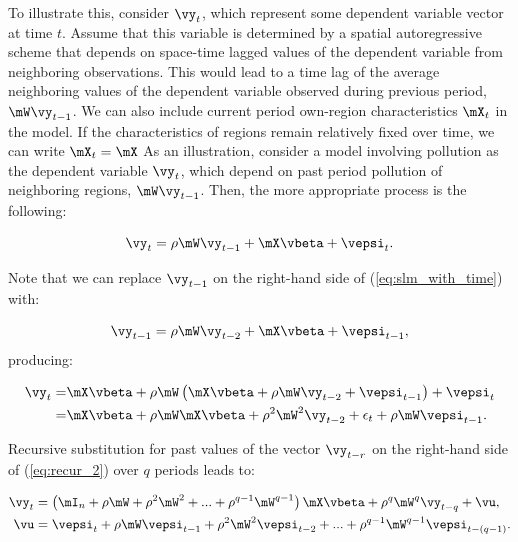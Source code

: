\documentclass[english,12pt]{book}\usepackage[]{graphicx}\usepackage[]{xcolor}
\begin{document}
To illustrate this, consider $\vy_t$, which represent some dependent variable vector at time $t$. Assume that this variable is determined by a spatial autoregressive scheme that depends on space-time lagged values of the dependent variable from neighboring observations. This would lead to a time lag of the average neighboring values of the dependent variable observed during previous period,  $\mW\vy_{t-1}$. We can also include current period own-region characteristics $\mX_t$ in the model. If the characteristics of regions remain relatively fixed over time, we can write $\mX_t = \mX$ As an illustration, consider a model involving pollution as the dependent variable $\vy_t$, which depend on past period pollution of neighboring regions, $\mW\vy_{t-1}$. Then, the more appropriate process is the following:

\begin{equation}\label{eq:slm_with_time}
\vy_t = \rho \mW\vy_{t-1} + \mX\vbeta + \vepsi_t.
\end{equation}

Note that we can replace $\vy_{t-1}$ on the right-hand side of (\ref{eq:slm_with_time}) with:

\begin{equation*}
\vy_{t-1} = \rho \mW\vy_{t-2} + \mX\vbeta + \vepsi_{t-1},
\end{equation*}
%
producing:

\begin{equation}\label{eq:recur_2}
\begin{aligned}
\vy_t  = & \mX\vbeta +\rho\mW\left(\mX\vbeta + \rho \mW\vy_{t-2} + \vepsi_{t-1}\right) + \vepsi_t\\
=& \mX\vbeta +\rho\mW\mX\vbeta + \rho^2\mW^2\vy_{t-2} + \epsilon_t + \rho\mW\vepsi_{t-1}.
\end{aligned}
\end{equation}

Recursive substitution for past values of the vector $\vy_{t-r}$ on the right-hand side of (\ref{eq:recur_2}) over $q$ periods leads to:

\begin{equation*}
  \begin{aligned}
    \vy_t &= \left(\mI_n + \rho\mW + \rho^2\mW^2 + ... + \rho^{q-1}\mW^{q-1}\right)\mX\vbeta + \rho^q\mW^q\vy_{t-q} + \vu,\\
    \vu  & = \vepsi_{t} + \rho\mW\vepsi_{t-1} + \rho^2\mW^2\vepsi_{t-2} + ... + \rho^{q-1}\mW^{q-1}\vepsi_{t - (q-1)}. 
  \end{aligned}
\end{equation*}
\end{document}
